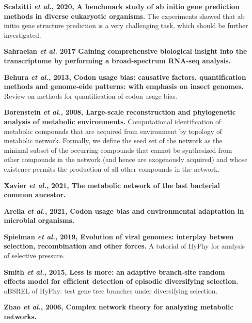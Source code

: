 \documentclass[11pt]{article}
\begin{document}
\begin{sloppypar}
\par
\textbf{Scalzitti \textit{et al.}, 2020, A benchmark study of ab initio gene prediction methods in diverse eukaryotic organisms.} \newline
The experiments showed that ab initio gene structure prediction is a very challenging task, which should be further investigated. 
\par
\textbf{Sahraeian \textit{et al.} 2017 Gaining comprehensive biological insight into the transcriptome by performing a broad-spectrum RNA-seq analysis.} \newline
\par
\textbf{Behura \textit{et al.}, 2013, Codon usage bias: causative factors, quantification methods and genome-eide patterns: with emphasis on insect genomes.} \newline
Review on methods for quantification of codon usage bias.
\par
\textbf{Borenstein \textit{et al.}, 2008, Large-scale reconstruction and phylogenetic analysis of metabolic environments.} \newline
Computational identification of metabolic compounds that are acquired from environment by topology of metabolic network. 
Formally, we define the seed set of the network as the minimal subset of the occurring compounds that cannot be synthesized from other compounds in the network (and hence are exogenously acquired) and whose existence permits the production of all other compounds in the network.
\par
\textbf{Xavier \textit{et al.}, 2021, The metabolic network of the last bacterial common ancestor.} \newline
\par
\textbf{Arella \textit{et al.}, 2021, Codon usage bias and environmental adaptation in microbial organisms.} \newline
\par
\textbf{Spielman \textit{et al.}, 2019, Evolution of viral genomes: interplay betwen selection, recombination and other forces.} \newline
A tutorial of HyPhy for analysis of selective pressure.
\par
\textbf{Smith \textit{et al.}, 2015, Less is more: an adaptive branch-site random effects model for efficient detection of episodic diversifying selection.} \newline
aBSREL of HyPhy: test gene tree branches under diversifying selection.
\par
\textbf{Zhao \textit{et al.}, 2006, Complex network theory for analyzing metabolic networks.} \newline

\end{sloppypar}
\end{document}
